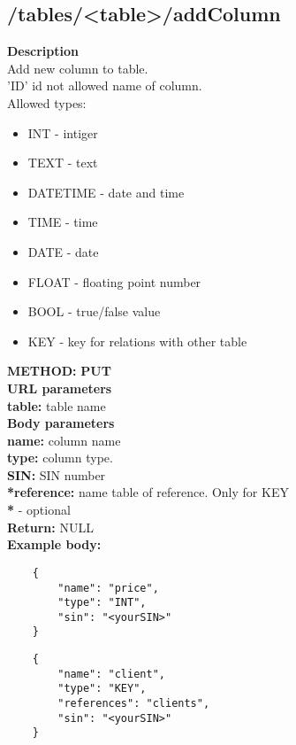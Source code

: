\documentclass[a4paper, 12pt]{report}
\begin{document}
\subsection{/tables/<table>/addColumn}
\textbf{\color{redText} Description} \\
Add new column to table. \\
'ID' id not allowed name of column.\\
Allowed types: 
\begin{itemize}
    \item INT - intiger 
    \item TEXT - text 
    \item DATETIME - date and time 
    \item TIME - time
    \item DATE - date
    \item FLOAT - floating point number
    \item BOOL - true/false value
    \item KEY - key for relations with other table
\end{itemize}
\textbf{\color{redText} METHOD: } \textbf{PUT} \\
\textbf{\color{redText} URL parameters} \\
\textbf{table: } table name\\
\textbf{\color{redText} Body parameters} \\
\textbf{name: } column name\\
\textbf{type: } column type.\\
\textbf{SIN: } SIN number\\
\textbf{*reference: } name table of reference. Only for KEY \\
\textbf{*} - optional \\
\textbf{\color{redText} Return: } NULL \\
\textbf{\color{redText} Example body: }
\begin{lstlisting}
    {
        "name": "price",
        "type": "INT",
        "sin": "<yourSIN>"
    }
\end{lstlisting}
\begin{lstlisting}
    {
        "name": "client",
        "type": "KEY",
        "references": "clients",
        "sin": "<yourSIN>"
    }
\end{lstlisting}
\end{document}
